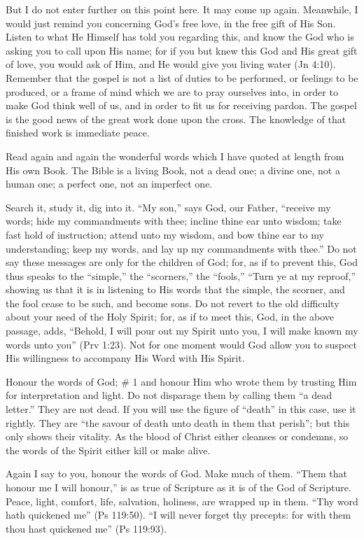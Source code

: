 \documentclass[
]{book}
\begin{document}
But I do not enter further on this point here. It may come up again. Meanwhile, I would just remind you concerning God's free love, in the free gift of His Son. Listen to what He Himself has told you regarding this, and know the God who is asking you to call upon His name; for if you but knew this God and His great gift of love, you would ask of Him, and He would give you living water (Jn 4:10). Remember that the gospel is not a list of duties to be performed, or feelings to be produced, or a frame of mind which we are to pray ourselves into, in order to make God think well of us, and in order to fit us for receiving pardon. The gospel is the good news of the great work done upon the cross. The knowledge of that finished work is immediate peace.

Read again and again the wonderful words which I have quoted at length from His own Book. The Bible is a living Book, not a dead one; a divine one, not a human one; a perfect one, not an imperfect one.

Search it, study it, dig into it. ``My son,'' says God, our Father, ``receive my words; hide my commandments with thee; incline thine ear unto wisdom; take fast hold of instruction; attend unto my wisdom, and bow thine ear to my understanding; keep my words, and lay up my commandments with thee.'' Do not say these messages are only for the children of God; for, as if to prevent this, God thus speaks to the ``simple,'' the ``scorners,'' the ``fools,'' ``Turn ye at my reproof,'' showing us that it is in listening to His words that the simple, the scorner, and the fool cease to be such, and become sons. Do not revert to the old difficulty about your need of the Holy Spirit; for, as if to meet this, God, in the above passage, adds, ``Behold, I will pour out my Spirit unto you, I will make known my words unto you'' (Prv 1:23). Not for one moment would God allow you to suspect His willingness to accompany His Word with His Spirit.

Honour the words of God;
\# 1
and honour Him who wrote them by trusting Him for interpretation and light. Do not disparage them by calling them ``a dead letter.'' They are not dead. If you will use the figure of ``death'' in this case, use it rightly. They are ``the savour of death unto death in them that perish''; but this only shows their vitality. As the blood of Christ either cleanses or condemns, so the words of the Spirit either kill or make alive.

Again I say to you, honour the words of God. Make much of them. ``Them that honour me I will honour,'' is as true of Scripture as it is of the God of Scripture. Peace, light, comfort, life, salvation, holiness, are wrapped up in them. ``Thy word hath quickened me'' (Ps 119:50). ``I will never forget thy precepts: for with them thou hast quickened me'' (Ps 119:93).
\end{document}
